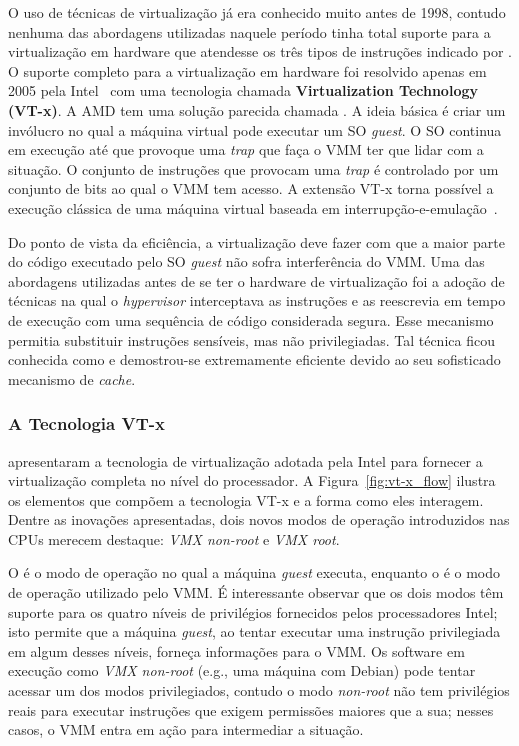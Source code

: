 O uso de técnicas de virtualização já era conhecido muito antes de 1998,
contudo nenhuma das abordagens utilizadas naquele período tinha total suporte
para a virtualização em hardware que atendesse os três tipos de instruções
indicado por \citet{popek}. O suporte completo para a virtualização em hardware
foi resolvido apenas em 2005 pela Intel~\citep{uhlig} com uma tecnologia
chamada \textbf{Virtualization Technology (VT-x)}. A AMD tem uma
solução parecida chamada . A ideia
básica é criar um invólucro no qual a máquina virtual pode executar um SO
\emph{guest}.  O SO continua em execução até que provoque uma \emph{trap} que
faça o VMM ter que lidar com a situação. O conjunto de instruções que provocam
uma \emph{trap} é controlado por um conjunto de bits ao qual o VMM tem acesso.
A extensão VT-x torna possível a execução clássica de uma máquina virtual
baseada em interrupção-e-emulação~\citep{tanenbaum}.

Do ponto de vista da eficiência, a virtualização deve fazer com que a maior
parte do código executado pelo SO \emph{guest} não sofra interferência do VMM.
Uma das abordagens utilizadas antes de se ter o hardware de virtualização foi a
adoção de técnicas na qual o \textit{hypervisor} interceptava as instruções e
as reescrevia em tempo de execução com uma sequência de código considerada
segura. Esse mecanismo permitia substituir instruções sensíveis, mas não
privilegiadas. Tal técnica ficou conhecida como 
e demostrou-se extremamente eficiente devido ao seu sofisticado mecanismo de
\emph{cache}.


\subsubsection{A Tecnologia VT-x}
\label{sec:vtx}

\citet{uhlig} apresentaram a tecnologia de virtualização adotada pela Intel para
fornecer a virtualização completa no nível do processador. A
Figura~\ref{fig:vt-x_flow} ilustra os elementos que compõem a tecnologia VT-x e a
forma como eles interagem. Dentre as inovações apresentadas, dois novos modos
de operação introduzidos nas CPUs merecem destaque: \emph{VMX non-root} e
\emph{VMX root}.

O  é o modo de operação no qual a máquina
\emph{guest} executa, enquanto o  é o modo de operação utilizado
pelo VMM. É interessante observar que os dois modos têm suporte para os quatro
níveis de privilégios fornecidos pelos processadores Intel; isto permite que a
máquina \emph{guest}, ao tentar executar uma instrução privilegiada em algum
desses níveis, forneça informações para o VMM. Os software em execução como
\emph{VMX non-root} (e.g., uma máquina com Debian) pode tentar acessar um dos
modos privilegiados, contudo o modo \emph{non-root} não tem privilégios reais
para executar instruções que exigem permissões maiores que a sua; nesses casos,
o VMM entra em ação para intermediar a situação.

